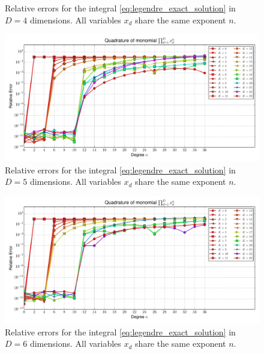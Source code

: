 \documentclass[a4paper,10pt]{article}
\begin{document}
\begin{subfigures}
\begin{figure}
    \caption{Relative errors for the integral \eqref{eq:legendre_exact_solution}
    in $D=4$ dimensions. All variables $x_d$ share the same exponent $n$.}
    \label{fig:monomial_errors_legendre_multivariate_dimension_4}
  \end{figure}
  \begin{figure}\centering
    \includegraphics[width=\linewidth]{./img/monomial_errors_legendre_multivariate_dimension_5.pdf}
    \caption{Relative errors for the integral \eqref{eq:legendre_exact_solution}
    in $D=5$ dimensions. All variables $x_d$ share the same exponent $n$.}
    \label{fig:monomial_errors_legendre_multivariate_dimension_5}
  \end{figure}
  \begin{figure}\centering
    \includegraphics[width=\linewidth]{./img/monomial_errors_legendre_multivariate_dimension_6.pdf}
    \caption{Relative errors for the integral \eqref{eq:legendre_exact_solution}
    in $D=6$ dimensions. All variables $x_d$ share the same exponent $n$.}
    \label{fig:monomial_errors_legendre_multivariate_dimension_6}
  \end{figure}
  \label{fig:monomial_errors_legendre_multivariate}
\end{subfigures}
\end{document}
